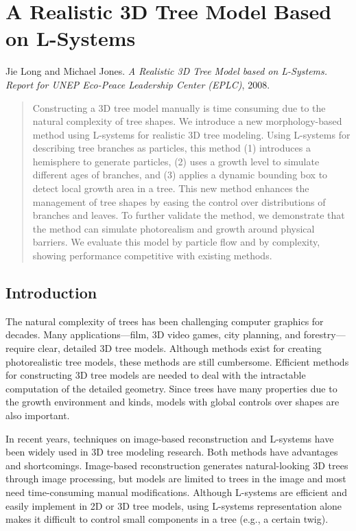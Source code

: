 \chapter{A Realistic 3D Tree Model Based on L-Systems}
\label{chap:treeLsystem}

\noindent
Jie Long and Michael Jones. \emph{A Realistic 3D Tree Model based on L-Systems. Report for UNEP Eco-Peace Leadership Center (EPLC)}, 2008.

\begin{abstract}
Constructing a 3D tree model manually is time consuming due to the natural complexity of tree shapes. We introduce a new morphology-based method using L-systems for realistic 3D tree modeling. Using L-systems for describing tree branches as particles, this method (1) introduces a hemisphere to generate particles, (2) uses a growth level to simulate different ages of branches, and (3) applies a dynamic bounding box to detect local growth area in a tree. This new method enhances the management of tree shapes by easing the control over distributions of branches and leaves. To further validate the method, we demonstrate that the method can simulate photorealism and growth around physical barriers. We evaluate this model by particle flow and by complexity, showing performance competitive with existing methods.
\end{abstract}

\section{Introduction}

The natural complexity of trees has been challenging computer graphics for decades. Many applications---film, 3D video games, city planning, and forestry---require clear, detailed 3D tree models. Although methods exist for creating photorealistic tree models, these methods are still cumbersome. Efficient methods for constructing 3D tree models are needed to deal with the intractable computation of the detailed geometry. Since trees have many properties due to the growth environment and kinds, models with global controls over shapes are also important. 

In recent years, techniques on image-based reconstruction and L-systems have been widely used in 3D tree modeling research. Both methods have advantages and shortcomings. Image-based reconstruction generates natural-looking 3D trees through image processing, but models are limited to trees in the image and most need time-consuming manual modifications. Although L-systems are efficient and easily implement in 2D or 3D tree models, using L-systems representation alone makes it difficult to control small components in a tree (e.g., a certain twig). 

